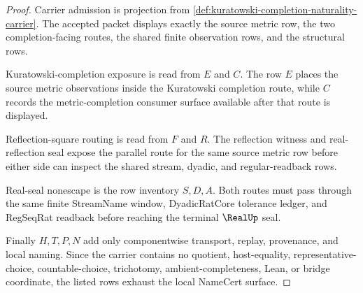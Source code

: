 \begin{proof}
Carrier admission is projection from \autoref{def:kuratowski-completion-naturality-carrier}. The accepted packet displays exactly the source metric row, the two completion-facing routes, the shared finite observation rows, and the structural rows.

Kuratowski-completion exposure is read from $E$ and $C$. The row $E$ places the source metric observations inside the Kuratowski completion route, while $C$ records the metric-completion consumer surface available after that route is displayed.

Reflection-square routing is read from $F$ and $R$. The reflection witness and real-reflection seal expose the parallel route for the same source metric row before either side can inspect the shared stream, dyadic, and regular-readback rows.

Real-seal nonescape is the row inventory $S,D,A$. Both routes must pass through the same finite StreamName window, DyadicRatCore tolerance ledger, and RegSeqRat readback before reaching the terminal $\RealUp$ seal.

Finally $H,T,P,N$ add only componentwise transport, replay, provenance, and local naming. Since the carrier contains no quotient, host-equality, representative-choice, countable-choice, trichotomy, ambient-completeness, Lean, or bridge coordinate, the listed rows exhaust the local NameCert surface.
\end{proof}

